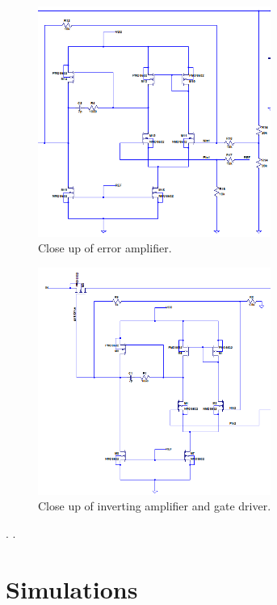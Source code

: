 \documentclass[10pt]{amsart}
\begin{document}
\begin{figure}[h]
	\begin{center}
		\includegraphics[width=3in]{Media/diff.png}
	\end{center}
	\caption{Close up of error amplifier.}
	\label{fig:pidfb}
\end{figure}

\begin{figure}[h]
	\begin{center}
		\includegraphics[width=3in]{Media/driver.png}
	\end{center}
	\caption{Close up of inverting amplifier and gate driver.}
	\label{fig:pidfb}
\end{figure}

.
\newpage
.
  
\section{Simulations}
\end{document}
